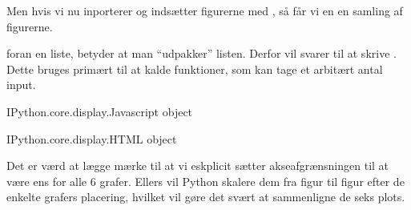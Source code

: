 \documentclass[letterpaper,10pt,english]{jupyterBook}
\begin{document}
\begin{sphinxVerbatim}
\end{sphinxVerbatim}

Men hvis vi nu inporterer  og indsætter figurerne med , så får vi en en samling af figurerne.

 \sphinxcode{\sphinxupquote{*}} foran en liste, betyder at man “udpakker” listen. Derfor vil \sphinxcode{\sphinxupquote{*{[}1, 2, 3{]}}} svarer til at skrive . Dette bruges primært til at kalde funktioner, som kan tage et arbitært antal input.

\begin{sphinxVerbatim}[commandchars=\\\{\}]
               
                        
\end{sphinxVerbatim}

\begin{sphinxVerbatim}[commandchars=\\\{\}]
\PYGZlt{}IPython.core.display.Javascript object\PYGZgt{}
\end{sphinxVerbatim}

\begin{sphinxVerbatim}[commandchars=\\\{\}]
\PYGZlt{}IPython.core.display.HTML object\PYGZgt{}
\end{sphinxVerbatim}

Det er værd at lægge mærke til at vi eskplicit sætter akseafgrænsningen til at være ens for alle 6 grafer. Ellers vil Python skalere dem fra figur til figur efter de enkelte grafers placering, hvilket vil gøre det svært at sammenligne de seks plots.
\end{document}
